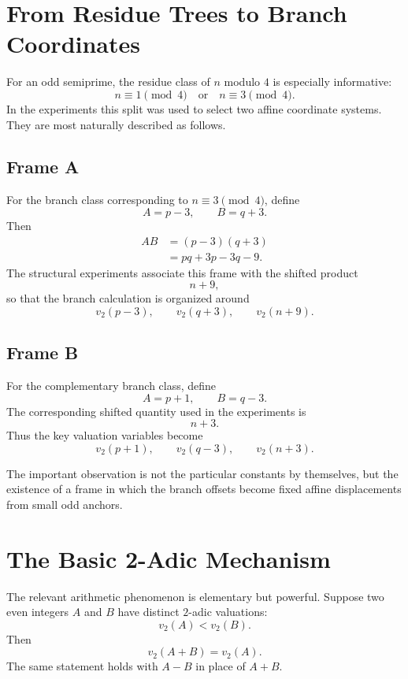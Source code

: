 \documentclass[11pt,a4paper]{article}
\newcommand{\vTwo}{v_2}
\begin{document}
\section{From Residue Trees to Branch Coordinates}

For an odd semiprime, the residue class of $n$ modulo $4$ is especially informative:
\[
    n\equiv1\pmod4
    \quad\text{or}\quad
    n\equiv3\pmod4.
\]
In the experiments this split was used to select two affine coordinate systems. They are most naturally described as follows.

\subsection{Frame A}

For the branch class corresponding to $n\equiv3\pmod4$, define
\[
    A=p-3,
    \qquad
    B=q+3.
\]
Then
\[
\begin{aligned}
    AB
    &=(p-3)(q+3)\\
    &=pq+3p-3q-9.
\end{aligned}
\]
The structural experiments associate this frame with the shifted product
\[
    n+9,
\]
so that the branch calculation is organized around
\[
    \vTwo(p-3),\qquad \vTwo(q+3),\qquad \vTwo(n+9).
\]

\subsection{Frame B}

For the complementary branch class, define
\[
    A=p+1,
    \qquad
    B=q-3.
\]
The corresponding shifted quantity used in the experiments is
\[
    n+3.
\]
Thus the key valuation variables become
\[
    \vTwo(p+1),\qquad \vTwo(q-3),\qquad \vTwo(n+3).
\]

The important observation is not the particular constants by themselves, but the existence of a frame in which the branch offsets become fixed affine displacements from small odd anchors.

\section{The Basic 2-Adic Mechanism}

The relevant arithmetic phenomenon is elementary but powerful. Suppose two even integers $A$ and $B$ have distinct $2$-adic valuations:
\[
    \vTwo(A)<\vTwo(B).
\]
Then
\[
    \vTwo(A+B)=\vTwo(A).
\]
The same statement holds with $A-B$ in place of $A+B$.
\end{document}

